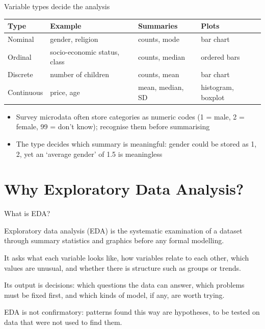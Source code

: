\begin{frame}{Variable types decide the analysis}
    \begin{center}
    \footnotesize
    \setlength{\tabcolsep}{3pt}
    \begin{tabular}{llll}
        \toprule
        Type & Example & Summaries & Plots \\
        \midrule
        Nominal & gender, religion & counts, mode & bar chart \\
        Ordinal & socio-economic status, class & counts, median & ordered bars \\
        Discrete & number of children & counts, mean & bar chart \\
        Continuous & price, age & mean, median, SD & histogram, boxplot \\
        \bottomrule
    \end{tabular}
    \end{center}
    \svspace{0.5em}
    \begin{itemize}
        \item Survey microdata often store categories as numeric codes (1 = male, 2 = female, 99 = don't know); recognise them before summarising
        \item The type decides which summary is meaningful: gender could be stored as 1, 2, yet an `average gender' of 1.5 is meaningless
    \end{itemize}
\end{frame}


\section{Why Exploratory Data Analysis?}

\begin{frame}{What is EDA?}
    \begin{sitemize}
        \item Exploratory data analysis (EDA) is the systematic examination of a dataset through summary statistics and graphics before any formal modelling.
        \item It asks what each variable looks like, how variables relate to each other, which values are unusual, and whether there is structure such as groups or trends.
        \item Its output is decisions: which questions the data can answer, which problems must be fixed first, and which kinds of model, if any, are worth trying.
        \item EDA is not confirmatory: patterns found this way are hypotheses, to be tested on data that were not used to find them.
    \end{sitemize}
\end{frame}


